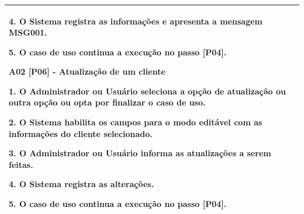 \begin{quadro}[!htbp]
\begin{tabular}{  m{4cm}  m{11cm} }
        4. O Sistema registra as informações e apresenta a mensagem MSG001.
        
        5. O caso de uso continua a execução no passo [P04].
        
        \textbf {A02 [P06] - Atualização de um cliente}
        
        1. O Administrador ou Usuário seleciona a opção de atualização ou outra opção ou opta por finalizar o caso de uso.
        
        2. O Sistema habilita os campos para o modo editável com as informações do cliente selecionado.
        
        3. O Administrador ou Usuário informa as atualizações a serem feitas.
        
        4. O Sistema registra as alterações.
        
        5. O caso de uso continua a execução no passo [P04]. \\ \hline
		\end{tabular}
\end{quadro}

